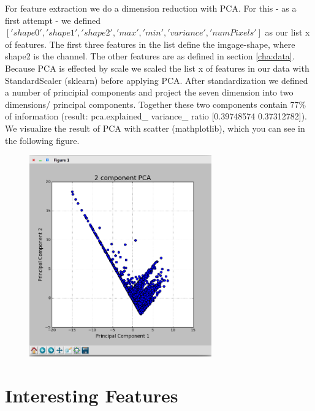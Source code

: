 For feature extraction we do a dimension reduction with PCA. For this - as a first attempt - we defined $['shape0','shape1','shape2','max','min','variance','numPixels']$ as our list x of features. 
The first three features in the list define the imgage-shape, where shape2 is the channel. The other features are as defined in section \ref{cha:data}. 
Because PCA is effected by scale we scaled the list x of features in our data with StandardScaler (sklearn)  before applying PCA.  
After standardization we  defined a number of principial components and project the seven dimension into two dimensions/ principal components. 
Together these two components contain 77\% of information (result: pca.explained\_ variance\_ ratio [0.39748574 0.37312782]).
We visualize the result of PCA with scatter (mathplotlib), which you can see in the following figure.  
\begin{figure}
	\includegraphics[width=0.7\textwidth]{images/pca}
\end{figure}

%
%
%
%
%
%
%
%

\section*{Interesting Features}

